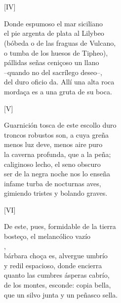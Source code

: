 \documentclass[11pt,a4paper,twoside]{article}
\begin{document}
\section*{\centering \fontsize{11}{14}\selectfont[FÁBULA]}
\vspace{-1em}
%
\begin{center}
	[IV]
\end{center}
\pstart
Donde espumoso el mar sicilïano\\
el pie argenta de plata al Lilybeo\\
(bóbeda o de las fraguas de Vulcano,\\
o tumba de los huesos de Tipheo),\\
pállidas señas ceniçoso un llano\\
--quando no del sacrílego deseo--,\\
del duro oficio da. Allí una alta roca\\
mordaça es a una gruta de su boca.\par\pend
%
\begin{center}
	[V]
\end{center}
\pstart
Guarnición tosca de este escollo duro\\
troncos robustos son, a cuya greña\\
menos luz deve, menos aire puro\\
la caverna profunda, que a la peña;\\
caliginoso lecho, el seno obscuro\\
ser de la negra noche nos lo enseña\\
infame turba de nocturnas aves,\\
gimiendo tristes y bolando graves.\par\pend
%
\begin{center}
	[VI]
\end{center}\pstart
De este, pues, formidable de la tierra\\
bosteço, el melancólico vazío\\
,\\
bárbara choça es, alvergue umbrío\\
y redil espacioso, donde encierra\\
quanto las cumbres ásperas cabrío,\\
de los montes, esconde: copia bella,\\
que un silvo junta y un peñasco sella.\par\pend
\end{document}
